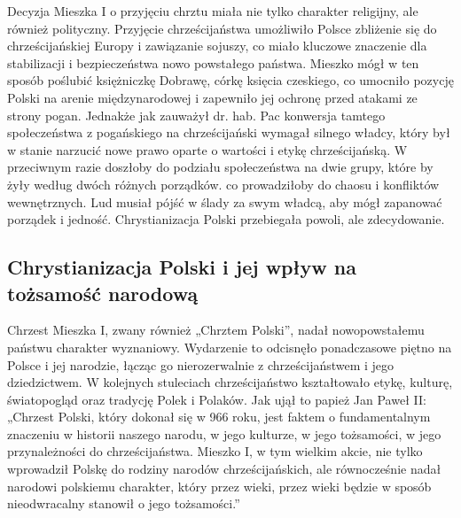 Decyzja Mieszka I o przyjęciu chrztu miała nie tylko charakter religijny, ale również polityczny. Przyjęcie chrześcijaństwa umożliwiło Polsce zbliżenie się do chrześcijańskiej Europy i zawiązanie sojuszy, co miało kluczowe znaczenie dla stabilizacji i bezpieczeństwa nowo powstałego państwa. Mieszko mógł w ten sposób poślubić księżniczkę Dobrawę, córkę księcia czeskiego, co umocniło pozycję Polski na arenie międzynarodowej i zapewniło jej ochronę przed atakami ze strony pogan. Jednakże jak zauważył dr. hab. Pac konwersja tamtego społeczeństwa z pogańskiego na chrześcijański wymagał silnego władcy, który był w stanie narzucić nowe prawo oparte o wartości i etykę chrześcijańską. W przeciwnym razie doszłoby do podziału społeczeństwa na dwie grupy, które by żyły według dwóch różnych porządków. co prowadziłoby do chaosu i konfliktów wewnętrznych. Lud musiał pójść w ślady za swym władcą, aby mógł zapanować porządek i jedność. Chrystianizacja Polski przebiegała powoli, ale zdecydowanie.

\subsection{Chrystianizacja Polski i jej wpływ na tożsamość narodową}

Chrzest Mieszka I, zwany również „Chrztem Polski”, nadał nowopowstałemu państwu charakter wyznaniowy. Wydarzenie to odcisnęło ponadczasowe piętno na Polsce i jej narodzie, łącząc go nierozerwalnie z chrześcijaństwem i jego dziedzictwem. W kolejnych stuleciach chrześcijaństwo kształtowało etykę, kulturę, światopogląd oraz tradycję Polek i Polaków. Jak ujął to papież Jan Paweł II:
„Chrzest Polski, który dokonał się w 966 roku, jest faktem o fundamentalnym znaczeniu w historii naszego narodu, w jego kulturze, w jego tożsamości, w jego przynależności do chrześcijaństwa. Mieszko I, w tym wielkim akcie, nie tylko wprowadził Polskę do rodziny narodów chrześcijańskich, ale równocześnie nadał narodowi polskiemu charakter, który przez wieki, przez wieki będzie w sposób nieodwracalny stanowił o jego tożsamości.”


